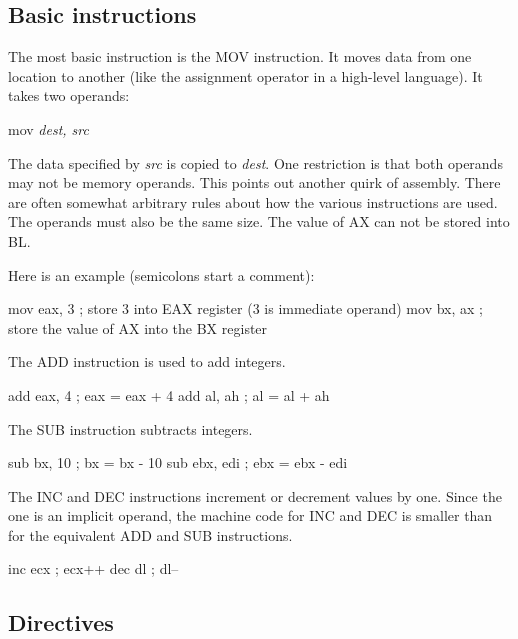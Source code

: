 \subsection{Basic instructions}

The most basic instruction is the {\code MOV}  instruction. It moves
data from one location to another (like the assignment operator in a
high-level language). It takes two operands:
\begin{CodeQuote}
  mov {\em dest, src}
\end{CodeQuote}
The data specified by {\em src} is copied to {\em dest\/}. One restriction
is that both operands may not be memory operands. This points out another
quirk of assembly. There are often somewhat arbitrary rules about how the
various instructions are used. The operands must also be the same size. The
value of AX can not be stored into BL.

Here is an example (semicolons start a comment):
\begin{AsmCodeListing}[frame=none, numbers=none]
      mov    eax, 3   ; store 3 into EAX register (3 is immediate operand) 
      mov    bx, ax   ; store the value of AX into the BX register 
\end{AsmCodeListing}

The {\code ADD}  instruction is used to add integers.
\begin{AsmCodeListing}[frame=none, numbers=none]
      add    eax, 4   ; eax = eax + 4
      add    al, ah   ; al = al + ah 
\end{AsmCodeListing}

The {\code SUB}  instruction subtracts integers.
\begin{AsmCodeListing}[frame=none, numbers=none]
      sub    bx, 10   ; bx = bx - 10
      sub    ebx, edi ; ebx = ebx - edi
\end{AsmCodeListing}

The {\code INC}  and {\code DEC}  instructions
increment or decrement values by one. Since the one is an implicit
operand, the machine code for {\code INC} and {\code DEC} is smaller
than for the equivalent {\code ADD} and {\code SUB} instructions.
\begin{AsmCodeListing}[frame=none, numbers=none]
      inc    ecx      ; ecx++
      dec    dl       ; dl--
\end{AsmCodeListing}

\subsection{Directives}

